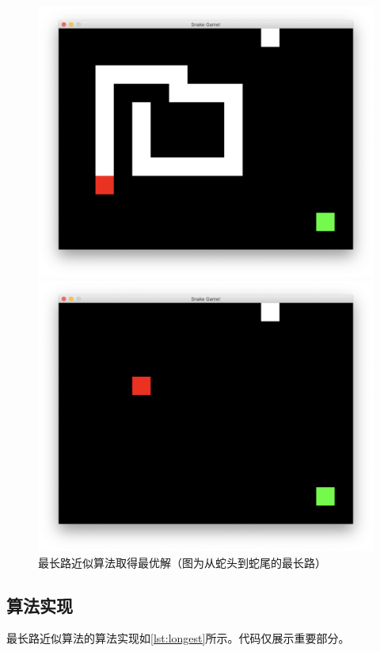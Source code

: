 \documentclass[a4paper]{article}
\begin{document}
\begin{figure}[!hbt]
\begin{minipage}{0.16\textwidth}
    \includegraphics[width=\linewidth]{assets/lp5.png}
\end{minipage}
\begin{minipage}{0.16\textwidth}
    \centering
    \includegraphics[width=\linewidth]{assets/lp6.png}
\end{minipage}
    \caption{最长路近似算法取得最优解（图为从蛇头到蛇尾的最长路）} \label{fig:lp}
\end{figure}

\subsection{算法实现}
最长路近似算法的算法实现如\autoref{lst:longest}所示。代码仅展示重要部分。\\
\end{document}
